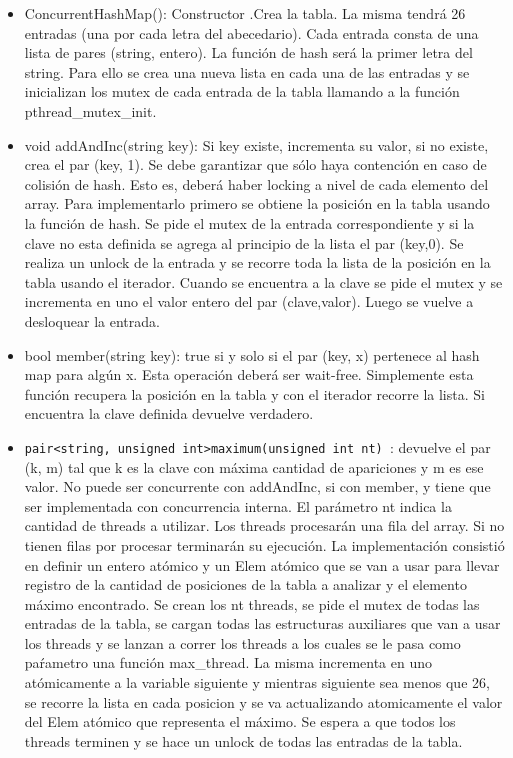 \documentclass[a4paper]{article}
\begin{document}
{\begin{itemize}

\item ConcurrentHashMap(): Constructor .Crea la tabla. La misma tendrá 26 entradas (una por
cada letra del abecedario). Cada entrada consta de una lista de pares (string, entero). La
función de hash será la primer letra del string. Para ello se crea una nueva lista en cada una de las entradas y se inicializan los mutex de cada entrada de la tabla llamando a la función pthread_mutex_init.\blindtext
\item void addAndInc(string key): Si key existe, incrementa su valor, si no existe, crea el par
(key, 1). Se debe garantizar que sólo haya contención en caso de colisión de hash. Esto es,
deberá haber locking a nivel de cada elemento del array. Para implementarlo primero se obtiene la posición en la tabla usando la función de hash. Se pide el mutex de la entrada correspondiente y si la clave no esta definida se agrega al principio de la lista el par (key,0). Se realiza un unlock de la entrada y se recorre toda la lista de la posición en la tabla usando el iterador. Cuando se encuentra a la clave se pide el mutex y se incrementa en uno el valor entero del par (clave,valor). Luego se vuelve a desloquear la entrada.\blindtext
\item bool member(string key): true si y solo si el par (key, x) pertenece al hash map para algún
x. Esta operación deberá ser wait-free. Simplemente esta función recupera la posición en la tabla y con el iterador recorre la lista. Si encuentra la clave definida devuelve verdadero. 
\item {\tt pair<string, unsigned int>maximum(unsigned int nt) }: devuelve el par (k, m) tal que
k es la clave con máxima cantidad de apariciones y m es ese valor. No puede ser concurrente
con addAndInc, si con member, y tiene que ser implementada con concurrencia interna. El
parámetro nt indica la cantidad de threads a utilizar. Los threads procesarán una fila del
array. Si no tienen filas por procesar terminarán su ejecución. La implementación consistió en definir un entero atómico y un Elem atómico que se van a usar para llevar registro de la cantidad de posiciones de la tabla a analizar y el elemento máximo encontrado. Se crean los nt threads, se pide el mutex de todas las entradas de la tabla, se cargan todas las estructuras auxiliares que van a usar los threads y se lanzan a correr los threads a los cuales se le pasa como paŕametro una función max_thread. La misma incrementa en uno atómicamente a la variable siguiente y mientras siguiente sea menos que 26, se recorre la lista en cada posicion y se va actualizando atomicamente el valor del Elem atómico que representa el máximo. Se espera a que todos los threads terminen y se hace un unlock de todas las entradas de la tabla.


\end{itemize}}
\end{document}
